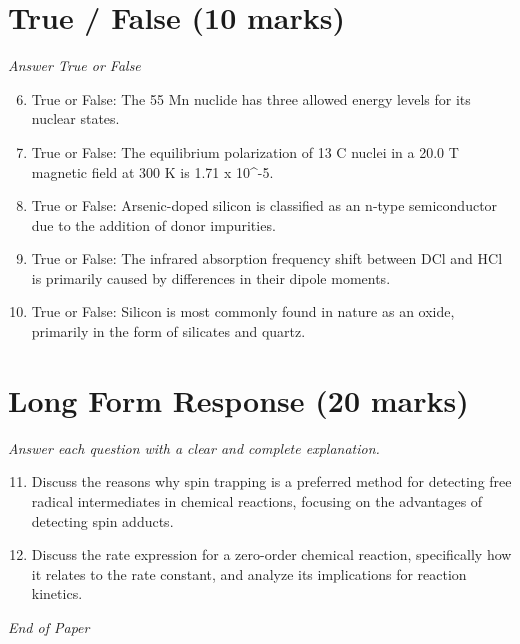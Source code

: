 \documentclass[12pt]{article}
\begin{document}
\section*{True / False (10 marks)}
\textit{Answer True or False}
\begin{enumerate}[label=\arabic*.]
\setcounter{enumi}{5}
\item True or False: The 55 Mn nuclide has three allowed energy levels for its nuclear states.
\item True or False: The equilibrium polarization of 13 C nuclei in a 20.0 T magnetic field at 300 K is 1.71 x 10^-5.
\item True or False: Arsenic-doped silicon is classified as an n-type semiconductor due to the addition of donor impurities.
\item True or False: The infrared absorption frequency shift between DCl and HCl is primarily caused by differences in their dipole moments.
\item True or False: Silicon is most commonly found in nature as an oxide, primarily in the form of silicates and quartz.
\end{enumerate}

\section*{Long Form Response (20 marks)}
\textit{Answer each question with a clear and complete explanation.}
\begin{enumerate}[label=\arabic*.]
\setcounter{enumi}{10}
\item Discuss the reasons why spin trapping is a preferred method for detecting free radical intermediates in chemical reactions, focusing on the advantages of detecting spin adducts.
\item Discuss the rate expression for a zero-order chemical reaction, specifically how it relates to the rate constant, and analyze its implications for reaction kinetics.
\end{enumerate}

\vfill
\noindent\textit{End of Paper}
\end{document}
